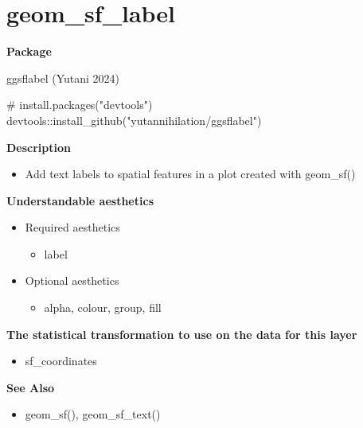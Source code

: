 \documentclass[
  letterpaper,
  DIV=11,
  numbers=noendperiod]{scrreprt}
\newenvironment{Shaded}{\begin{snugshade}}{\end{snugshade}}
\newcommand{\CommentTok}[1]{\textcolor[rgb]{0.37,0.37,0.37}{#1}}
\newcommand{\FunctionTok}[1]{\textcolor[rgb]{0.28,0.35,0.67}{#1}}
\newcommand{\NormalTok}[1]{\textcolor[rgb]{0.00,0.23,0.31}{#1}}
\newcommand{\SpecialCharTok}[1]{\textcolor[rgb]{0.37,0.37,0.37}{#1}}
\newcommand{\StringTok}[1]{\textcolor[rgb]{0.13,0.47,0.30}{#1}}
\providecommand{\tightlist}{%
  \setlength{\itemsep}{0pt}\setlength{\parskip}{0pt}}\usepackage{longtable,booktabs,array}
\begin{document}
\section{geom\_sf\_label}\label{geom_sf_label}

\textbf{Package}

ggsflabel (Yutani 2024)

\begin{Shaded}
\begin{Highlighting}[]
\CommentTok{\# install.packages("devtools")}
\NormalTok{devtools}\SpecialCharTok{::}\FunctionTok{install\_github}\NormalTok{(}\StringTok{"yutannihilation/ggsflabel"}\NormalTok{)}
\end{Highlighting}
\end{Shaded}

\textbf{Description}

\begin{itemize}
\tightlist
\item
  Add text labels to spatial features in a plot created with geom\_sf()
\end{itemize}

\textbf{Understandable aesthetics}

\begin{itemize}
\tightlist
\item
  Required aesthetics

  \begin{itemize}
  \tightlist
  \item
    label
  \end{itemize}
\item
  Optional aesthetics

  \begin{itemize}
  \tightlist
  \item
    alpha, colour, group, fill
  \end{itemize}
\end{itemize}

\textbf{The statistical transformation to use on the data for this
layer}

\begin{itemize}
\tightlist
\item
  sf\_coordinates
\end{itemize}

\textbf{See Also}

\begin{itemize}
\tightlist
\item
  geom\_sf(), geom\_sf\_text()
\end{itemize}
\end{document}
